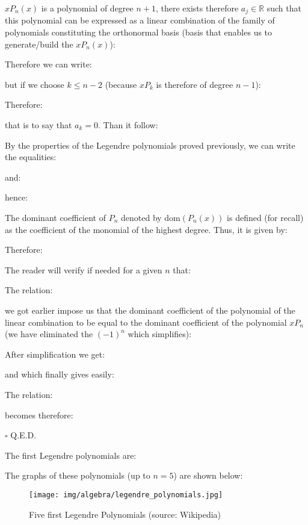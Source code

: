 	\begin{dem}
	$xP_n(x)$ is a polynomial of degree $n+1$, there exists therefore $a_j\in \mathbb{R}$ such that this polynomial can be expressed as a linear combination of the family of polynomials constituting the orthonormal basis (basis that enables us to generate/build the $xP_n(x)$):
	
	Therefore we can write:
	
	but if we choose $k\leq n-2$ (because $xP_k$ is therefore of degree $n-1$):
	
	Therefore:
	
	that is to say that $a_k=0$. Than it follow:
	
	By the properties of the Legendre polynomials proved previously, we can write the equalities:
	
	and:
	
	hence:
	
	The dominant coefficient of $P_n$ denoted by $\text{dom}(P_n(x))$ is defined (for recall) as the coefficient of the monomial of the highest degree. Thus, it is given by:
	
	Therefore:
	
	\begin{tcolorbox}[title=Remark,colframe=black,arc=10pt]
	The reader will verify if needed for a given $n$ that:
	
	\end{tcolorbox}
	The relation:
	
	we got earlier impose us that the dominant coefficient of the polynomial of the linear combination to be equal to the dominant coefficient of the polynomial $xP_n$ (we have eliminated the $(-1)^n$ which simplifies):
	
	After simplification we get:
	
	and which finally gives easily:
	
	The relation:
	
	becomes therefore:
		
	\begin{flushright}
		$\square$  Q.E.D.
	\end{flushright}
	\end{dem}
	The first Legendre polynomials are:
	

	The graphs of these polynomials (up to $n = 5$) are shown below:
	\begin{figure}[H]
		\centering
		\texttt{[image: img/algebra/legendre\_polynomials.jpg]}
		\caption{Five first Legendre Polynomials (source: Wikipedia)}
	\end{figure}
		


